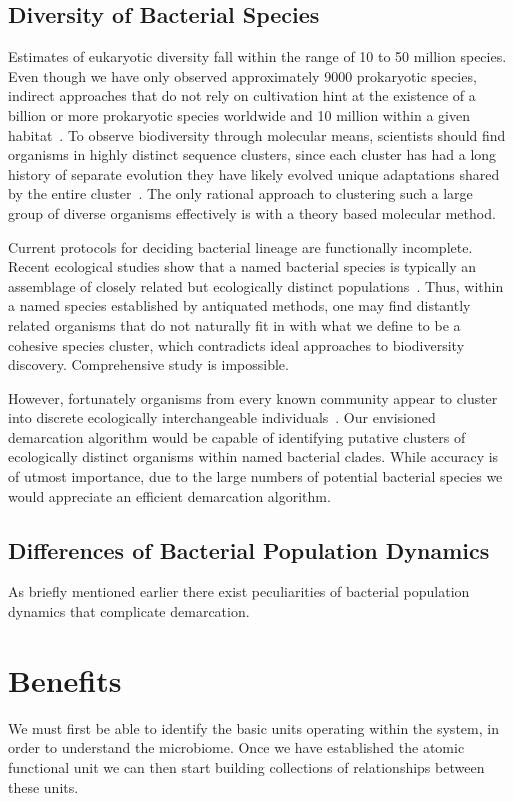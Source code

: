 \subsection{Diversity of Bacterial Species}
Estimates of eukaryotic diversity fall within the range of 10 to 50 million species. Even though we have only observed approximately 9000 prokaryotic species, indirect approaches that do not rely on cultivation hint at the existence of a billion or more prokaryotic species worldwide and 10 million within a given habitat~\cite{cohan2008origins}.
To observe biodiversity through molecular means, scientists should find organisms in highly distinct sequence clusters, since each cluster has had a long history of separate evolution they have likely evolved unique adaptations shared by the entire cluster~\cite{cohan2007systematics}.
The only rational approach to clustering such a large group of diverse organisms effectively is with a theory based molecular method.


Current protocols for deciding bacterial lineage are functionally incomplete. Recent ecological studies show that a named bacterial species is typically an assemblage of closely related but ecologically distinct populations~\cite{cohan2007systematics}.
Thus, within a named species established by antiquated methods, one may find distantly related organisms that do not naturally fit in with what we define to be a cohesive species cluster, which contradicts ideal approaches to biodiversity discovery.
Comprehensive study is impossible.

However, fortunately organisms from every known community appear to cluster into discrete ecologically interchangeable individuals~\cite{cohan2007systematics}.
Our envisioned demarcation algorithm would be capable of identifying putative clusters of ecologically distinct organisms within named bacterial clades. While accuracy is of utmost importance, due to the large numbers of potential bacterial species we would appreciate an efficient demarcation algorithm.



\subsection{Differences of Bacterial Population Dynamics}
As briefly mentioned earlier there exist peculiarities of bacterial population dynamics that complicate demarcation.

\section{Benefits}%
We must first be able to identify the basic units operating within the system, in order to understand the microbiome.
Once we have established the atomic functional unit we can then start building collections of relationships between these units. 


